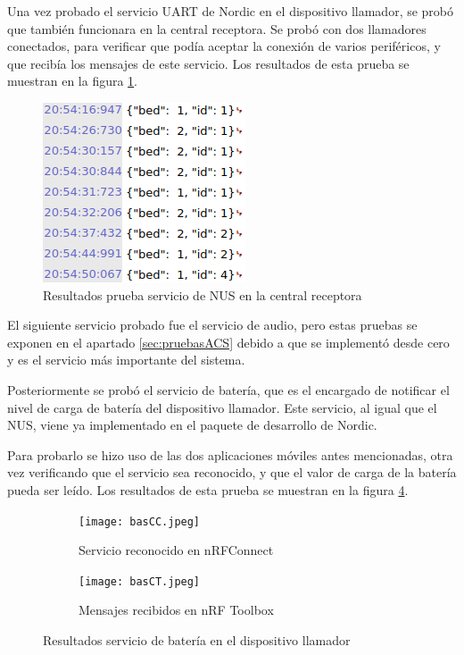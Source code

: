 Una vez probado el servicio UART de Nordic en el dispositivo llamador, se probó que también funcionara en la central receptora. Se probó con dos llamadores conectados, para verificar que podía aceptar la conexión de varios periféricos, y que recibía los mensajes de este servicio. Los resultados de esta prueba se muestran en la figura \ref{fig:Pnus2}.

\begin{figure}[htpb]
	\centering
	\includegraphics[scale=0.7]{./Figures/Pnus2.png}
	\caption{Resultados prueba servicio de NUS en la central receptora}
	\label{fig:Pnus2}
\end{figure}

El siguiente servicio probado  fue el servicio de audio, pero estas pruebas se exponen en el apartado \ref{sec:pruebasACS} debido a que se implementó desde cero y es el servicio más importante del sistema.

Posteriormente se probó el servicio de batería, que es el encargado de notificar el nivel de carga de batería del dispositivo llamador. Este servicio, al igual que el NUS, viene ya implementado en el paquete de desarrollo de Nordic.

Para probarlo se hizo uso de las dos aplicaciones móviles antes mencionadas, otra vez verificando que el servicio sea reconocido, y que el valor de carga de la batería pueda ser leído. Los resultados de esta prueba se muestran en la figura \ref{fig:Pbas}.

\begin{figure}[htpb]
	\centering
   	\begin{subfigure}[b]{1\textwidth}
   		\centering
      	\texttt{[image: basCC.jpeg]}
      	\caption{Servicio reconocido en nRFConnect}
      	\label{fig:PbasA}
   	\end{subfigure}%
   	\newline
   	\begin{subfigure}[b]{1\textwidth}
   		\centering
      	\texttt{[image: basCT.jpeg]}
      	\caption{Mensajes recibidos en nRF Toolbox}
      	\label{fig:PbasB}
   	\end{subfigure}%
	\caption{Resultados servicio de batería en el dispositivo llamador}
	\label{fig:Pbas}
\end{figure}

